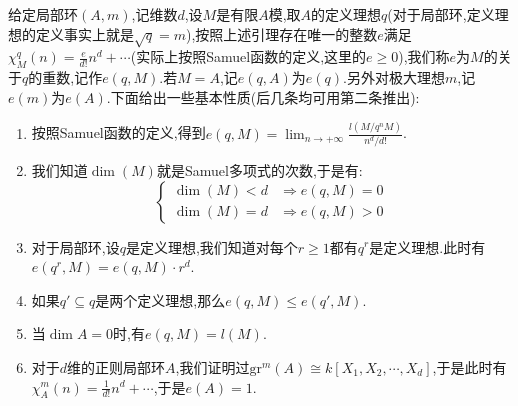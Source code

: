 给定局部环$(A,m)$,记维数$d$,设$M$是有限$A$模,取$A$的定义理想$q$(对于局部环,定义理想的定义事实上就是$\sqrt{q}=m$),按照上述引理存在唯一的整数$e$满足$\chi_M^q(n)=\frac{e}{d!}n^d+\cdots$(实际上按照Samuel函数的定义,这里的$e\ge0$),我们称$e$为$M$的关于$q$的重数,记作$e(q,M)$.若$M=A$,记$e(q,A)$为$e(q)$.另外对极大理想$m$,记$e(m)$为$e(A)$.下面给出一些基本性质(后几条均可用第二条推出):
\begin{enumerate}
	\item 按照Samuel函数的定义,得到$e(q,M)=\lim_{n\to+\infty}\frac{l(M/q^nM)}{n^d/d!}$.
	\item 我们知道$\dim(M)$就是Samuel多项式的次数,于是有:
	$$\left\{\begin{array}{cc}\dim(M)<d&\Rightarrow e(q,M)=0\\ \dim(M)=d&\Rightarrow e(q,M)>0\end{array}\right.$$
	\item 对于局部环,设$q$是定义理想,我们知道对每个$r\ge1$都有$q^r$是定义理想.此时有$e(q^r,M)=e(q,M)\cdot r^d$.
	\item 如果$q'\subseteq q$是两个定义理想,那么$e(q,M)\le e(q',M)$.
	\item 当$\dim A=0$时,有$e(q,M)=l(M)$.
	\item 对于$d$维的正则局部环$A$,我们证明过$\mathrm{gr}^m(A)\cong k[X_1,X_2,\cdots,X_d]$,于是此时有$\chi_A^m(n)=\frac{1}{d!}n^d+\cdots$,于是$e(A)=1$.
\end{enumerate}

